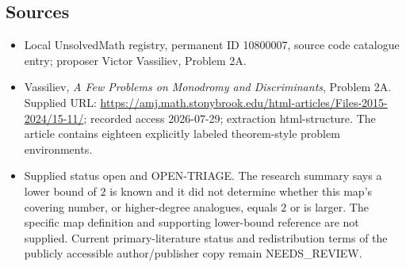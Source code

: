 \documentclass[11pt]{article}
\begin{document}
\subsection{Sources}
\begin{itemize}
\item Local UnsolvedMath registry, permanent ID 10800007, source code catalogue entry; proposer Victor Vassiliev, Problem 2A.
\item Vassiliev, \emph{A Few Problems on Monodromy and Discriminants}, Problem 2A. Supplied URL: \url{https://amj.math.stonybrook.edu/html-articles/Files-2015-2024/15-11/}; recorded access 2026-07-29; extraction html-structure. The article contains eighteen explicitly labeled theorem-style problem environments.
\item Supplied status open and OPEN-TRIAGE. The research summary says a lower bound of \(2\) is known and it did not determine whether this map's covering number, or higher-degree analogues, equals \(2\) or is larger. The specific map definition and supporting lower-bound reference are not supplied. Current primary-literature status and redistribution terms of the publicly accessible author/publisher copy remain NEEDS\_REVIEW.
\end{itemize}
\end{document}
